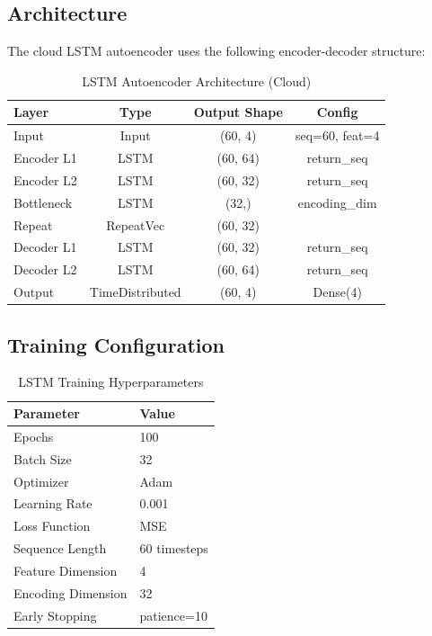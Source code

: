 \documentclass[conference]{IEEEtran}
\begin{document}
\subsection{Architecture}
The cloud LSTM autoencoder uses the following encoder-decoder structure:

\begin{table}[H]
\centering
\caption{LSTM Autoencoder Architecture (Cloud)}
\label{tab:lstm_arch}
\begin{tabular}{lccc}
\toprule
\textbf{Layer} & \textbf{Type} & \textbf{Output Shape} & \textbf{Config} \\
\midrule
Input & Input & (60, 4) & seq=60, feat=4 \\
Encoder L1 & LSTM & (60, 64) & return\_seq \\
Encoder L2 & LSTM & (60, 32) & return\_seq \\
Bottleneck & LSTM & (32,) & encoding\_dim \\
\midrule
Repeat & RepeatVec & (60, 32) & \\
Decoder L1 & LSTM & (60, 32) & return\_seq \\
Decoder L2 & LSTM & (60, 64) & return\_seq \\
Output & TimeDistributed & (60, 4) & Dense(4) \\
\bottomrule
\end{tabular}
\end{table}

\subsection{Training Configuration}
\begin{table}[H]
\centering
\caption{LSTM Training Hyperparameters}
\label{tab:lstm_training}
\begin{tabular}{ll}
\toprule
\textbf{Parameter} & \textbf{Value} \\
\midrule
Epochs & 100 \\
Batch Size & 32 \\
Optimizer & Adam \\
Learning Rate & 0.001 \\
Loss Function & MSE \\
Sequence Length & 60 timesteps \\
Feature Dimension & 4 \\
Encoding Dimension & 32 \\
Early Stopping & patience=10 \\
\bottomrule
\end{tabular}
\end{table}
\end{document}

